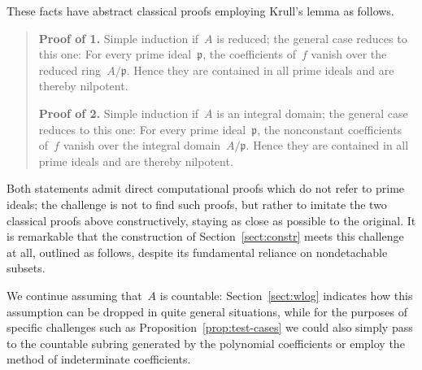 \documentclass[envcountsect,envcountsame,runningheads]{llncs}
\newcommand{\ppp}{\mathfrak{p}}
\renewcommand{\_}{\mathpunct{.}\,}
\begin{document}
These facts have abstract classical proofs employing Krull's lemma as follows.

\begin{quote}\small
  \textbf{Proof of 1.} Simple induction if~$A$ is
  reduced; the general case reduces to this one: For every prime ideal~$\ppp$,
  the coefficients of~$f$ vanish over the reduced ring~$A/\ppp$. Hence they are
  contained in all prime ideals and are thereby
  nilpotent.\medskip

  \textbf{Proof of 2.} Simple induction if~$A$ is an
  integral domain; the general case reduces to this one: For every prime
  ideal~$\ppp$, the nonconstant coefficients of~$f$ vanish over the integral
  domain~$A/\ppp$. Hence they are contained in all prime ideals
  and are thereby nilpotent.
\end{quote}

Both statements admit direct computational proofs which do not
refer to prime ideals; the challenge is not to find such proofs, but rather to
imitate the two classical proofs above constructively, staying as close as
possible to the original. It is remarkable that the construction of
Section~\ref{sect:constr} meets this challenge at all, outlined as follows, despite its fundamental
reliance on nondetachable subsets.

We continue assuming that~$A$ is countable:
Section~\ref{sect:wlog} indicates how this assumption can be dropped in quite
general situations, while for the purposes of specific challenges such as Proposition~\ref{prop:test-cases} we could also
simply pass to the countable subring generated by the polynomial coefficients
or employ the method of indeterminate coefficients.
\end{document}
